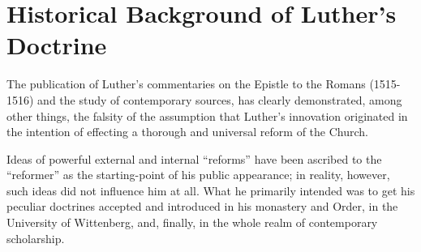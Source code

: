 \section{Historical Background of Luther’s Doctrine}

The publication of Luther’s commentaries on the Epistle to the
Romans (1515-1516) and the study of contemporary sources, has
clearly demonstrated, among other things, the falsity of the assumption
that Luther’s innovation originated in the intention of effecting
a thorough and universal reform of the Church.

Ideas of powerful external and internal “reforms” have been ascribed
to the “reformer” as the starting-point of his public appearance;
in reality, however, such ideas did not influence him at all.
What he primarily intended was to get his peculiar doctrines accepted
and introduced in his monastery and Order, in the University
of Wittenberg, and, finally, in the whole realm of contemporary
scholarship.

